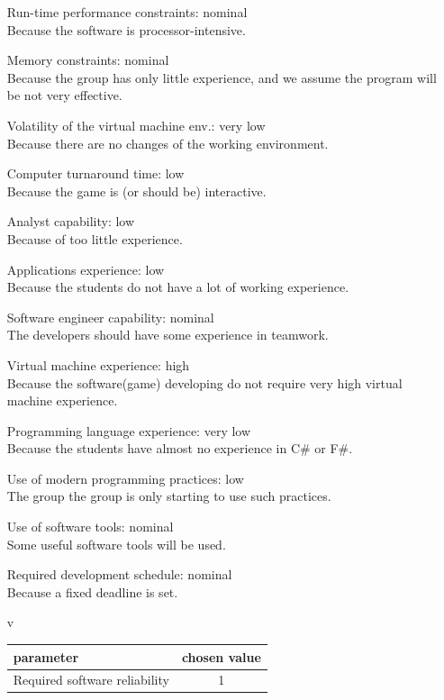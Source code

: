 \documentclass{scrartcl}
\begin{document}
\begin{itemize}
		\item[]Run-time performance constraints:   nominal \\
		Because the software is processor-intensive.
		\item[]Memory constraints:  nominal\\
		Because the group has only little experience, and we assume the program will be not very effective.
		\item[]Volatility of the virtual machine env.:  very low \\
		Because there are no changes of the working environment.
		\item[]Computer turnaround time:  low\\
		Because the game is (or should be) interactive.
		\item[]Analyst capability:  low\\
		Because of too little experience.
		\item[]Applications experience:  low \\
		Because the students do not have a lot of working experience.
		\item[]Software engineer capability:  nominal\\
		The developers should have some experience in teamwork.
		\item[]Virtual machine experience:  high \\
		Because the software(game) developing do not require very high virtual machine experience.
		\item[]Programming language experience:  very low\\
		Because the students have almost no experience in C\# or F\#.
		\item[]Use of modern programming practices:  low\\
		The group the group is only starting to use such practices.
		\item[]Use of software tools:  nominal\\
		Some useful software tools will be used.
		\item[]Required development schedule:  nominal\\
		Because a fixed deadline is set.


	\item[v]
	\begin{tabular}{l | c}
		parameter & chosen value \\
		\hline

		Required software reliability & 1\\


\end{tabular}
\end{itemize}
\end{document}
